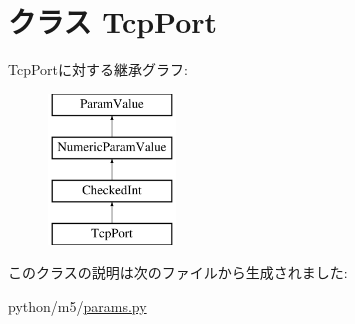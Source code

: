 \hypertarget{classm5_1_1params_1_1TcpPort}{
\section{クラス TcpPort}
\label{classm5_1_1params_1_1TcpPort}
}
TcpPortに対する継承グラフ:\begin{figure}[H]
\begin{center}
\leavevmode
\includegraphics[height=4cm]{classm5_1_1params_1_1TcpPort}
\end{center}
\end{figure}


このクラスの説明は次のファイルから生成されました:\begin{DoxyCompactItemize}
\item 
python/m5/\hyperlink{params_8py}{params.py}\end{DoxyCompactItemize}
